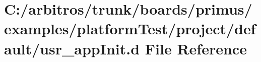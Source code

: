 \hypertarget{platform_test_2project_2default_2usr__app_init_8d}{\section{C\-:/arbitros/trunk/boards/primus/examples/platform\-Test/project/default/usr\-\_\-app\-Init.d File Reference}
\label{platform_test_2project_2default_2usr__app_init_8d}
}
